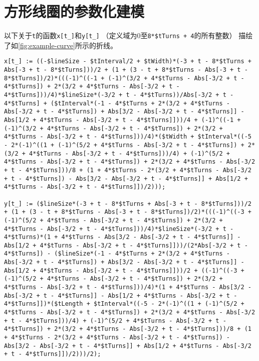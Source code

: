 \documentclass[index]{subfiles}
\begin{document}
\chapter{方形线圈的参数化建模}\label{sec:tricks}
以下关于\lstinline"t"的函数\lstinline"x[t_]"和\lstinline"y[t_]"
（定义域为0至\lstinline"8*$tTurns + 4"的所有整数）
描绘了如\cref{fig:example-curve}所示的折线。
\begin{lstlisting}[breaklines]
x[t_] := ((-$lineSize - $tInterval/2 + $tWidth)*(-3 + t - 8*$tTurns + Abs[-3 + t - 8*$tTurns]))/2 + (1 + (3 - t + 8*$tTurns - Abs[-3 + t - 8*$tTurns])/2)*(((-1)^((-1 + (-1)^(3/2 + 4*$tTurns - Abs[-3/2 + t - 4*$tTurns]) + 2*(3/2 + 4*$tTurns - Abs[-3/2 + t - 4*$tTurns]))/4)*$lineSize*(-3/2 + t - 4*$tTurns))/Abs[-3/2 + t - 4*$tTurns] + ($tInterval*(-1 - 4*$tTurns + 2*(3/2 + 4*$tTurns - Abs[-3/2 + t - 4*$tTurns]) + Abs[3/2 - Abs[-3/2 + t - 4*$tTurns]] - Abs[1/2 + 4*$tTurns - Abs[-3/2 + t - 4*$tTurns]]))/4 + (-1)^((-1 + (-1)^(3/2 + 4*$tTurns - Abs[-3/2 + t - 4*$tTurns]) + 2*(3/2 + 4*$tTurns - Abs[-3/2 + t - 4*$tTurns]))/4)*($tWidth + $tInterval*((-5 - 2*(-1)^((1 + (-1)^(5/2 + 4*$tTurns - Abs[-3/2 + t - 4*$tTurns]) + 2*(3/2 + 4*$tTurns - Abs[-3/2 + t - 4*$tTurns]))/4) + (-1)^(5/2 + 4*$tTurns - Abs[-3/2 + t - 4*$tTurns]) + 2*(3/2 + 4*$tTurns - Abs[-3/2 + t - 4*$tTurns]))/8 + (1 + 4*$tTurns - 2*(3/2 + 4*$tTurns - Abs[-3/2 + t - 4*$tTurns]) - Abs[3/2 - Abs[-3/2 + t - 4*$tTurns]] + Abs[1/2 + 4*$tTurns - Abs[-3/2 + t - 4*$tTurns]])/2)));

y[t_] := ($lineSize*(-3 + t - 8*$tTurns + Abs[-3 + t - 8*$tTurns]))/2 + (1 + (3 - t + 8*$tTurns - Abs[-3 + t - 8*$tTurns])/2)*(((-1)^((-3 + (-1)^(5/2 + 4*$tTurns - Abs[-3/2 + t - 4*$tTurns]) + 2*(3/2 + 4*$tTurns - Abs[-3/2 + t - 4*$tTurns]))/4)*$lineSize*(-3/2 + t - 4*$tTurns)*(1 + 4*$tTurns - Abs[3/2 - Abs[-3/2 + t - 4*$tTurns]] - Abs[1/2 + 4*$tTurns - Abs[-3/2 + t - 4*$tTurns]]))/(2*Abs[-3/2 + t - 4*$tTurns]) - ($lineSize*(-1 - 4*$tTurns + 2*(3/2 + 4*$tTurns - Abs[-3/2 + t - 4*$tTurns]) + Abs[3/2 - Abs[-3/2 + t - 4*$tTurns]] - Abs[1/2 + 4*$tTurns - Abs[-3/2 + t - 4*$tTurns]]))/2 + ((-1)^((-3 + (-1)^(5/2 + 4*$tTurns - Abs[-3/2 + t - 4*$tTurns]) + 2*(3/2 + 4*$tTurns - Abs[-3/2 + t - 4*$tTurns]))/4)*(1 + 4*$tTurns - Abs[3/2 - Abs[-3/2 + t - 4*$tTurns]] - Abs[1/2 + 4*$tTurns - Abs[-3/2 + t - 4*$tTurns]])*($tLength + $tInterval*((-5 - 2*(-1)^((1 + (-1)^(5/2 + 4*$tTurns - Abs[-3/2 + t - 4*$tTurns]) + 2*(3/2 + 4*$tTurns - Abs[-3/2 + t - 4*$tTurns]))/4) + (-1)^(5/2 + 4*$tTurns - Abs[-3/2 + t - 4*$tTurns]) + 2*(3/2 + 4*$tTurns - Abs[-3/2 + t - 4*$tTurns]))/8 + (1 + 4*$tTurns - 2*(3/2 + 4*$tTurns - Abs[-3/2 + t - 4*$tTurns]) - Abs[3/2 - Abs[-3/2 + t - 4*$tTurns]] + Abs[1/2 + 4*$tTurns - Abs[-3/2 + t - 4*$tTurns]])/2)))/2);
\end{lstlisting}
\end{document}
